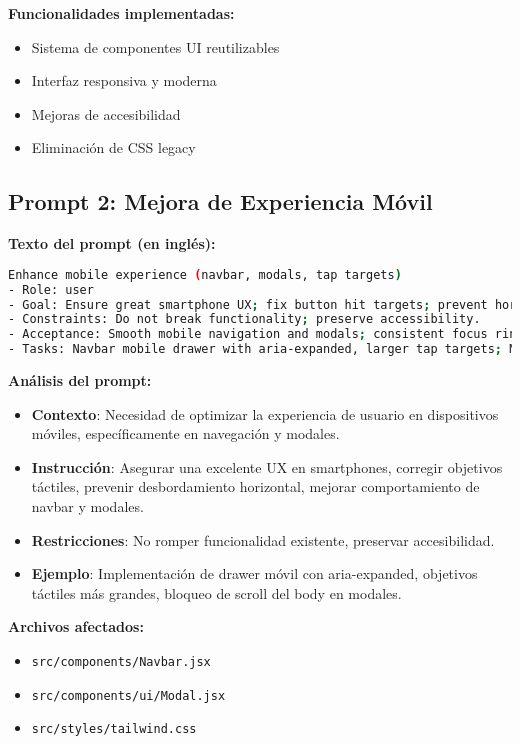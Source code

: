 \documentclass[12pt,a4paper]{article}
\begin{document}
\textbf{Funcionalidades implementadas:}
\begin{itemize}
    \item Sistema de componentes UI reutilizables
    \item Interfaz responsiva y moderna
    \item Mejoras de accesibilidad
    \item Eliminación de CSS legacy
\end{itemize}

\subsection{Prompt 2: Mejora de Experiencia Móvil}

\textbf{Texto del prompt (en inglés):}
\begin{lstlisting}[language=bash]
Enhance mobile experience (navbar, modals, tap targets)
- Role: user
- Goal: Ensure great smartphone UX; fix button hit targets; prevent horizontal overflow; improve navbar and modal behavior.
- Constraints: Do not break functionality; preserve accessibility.
- Acceptance: Smooth mobile navigation and modals; consistent focus ring; no overflow.
- Tasks: Navbar mobile drawer with aria-expanded, larger tap targets; Modal with body scroll lock, sticky header, `max-h` and internal scroll; remove tap highlight; safe-area utilities.
\end{lstlisting}

\textbf{Análisis del prompt:}
\begin{itemize}
    \item \textbf{Contexto}: Necesidad de optimizar la experiencia de usuario en dispositivos móviles, específicamente en navegación y modales.
    \item \textbf{Instrucción}: Asegurar una excelente UX en smartphones, corregir objetivos táctiles, prevenir desbordamiento horizontal, mejorar comportamiento de navbar y modales.
    \item \textbf{Restricciones}: No romper funcionalidad existente, preservar accesibilidad.
    \item \textbf{Ejemplo}: Implementación de drawer móvil con aria-expanded, objetivos táctiles más grandes, bloqueo de scroll del body en modales.
\end{itemize}

\textbf{Archivos afectados:}
\begin{itemize}
    \item \texttt{src/components/Navbar.jsx}
    \item \texttt{src/components/ui/Modal.jsx}
    \item \texttt{src/styles/tailwind.css}
\end{itemize}
\end{document}
